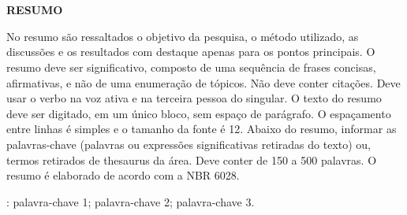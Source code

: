 \chapter*{}
\vspace{-4cm}
\begin{center}
 \textbf{RESUMO}
\end{center}
\vspace{0.5cm}

\noindent No resumo são ressaltados o objetivo da pesquisa, o método utilizado, as discussões e os resultados com destaque apenas para os pontos principais. O resumo deve ser significativo, composto de uma sequência de frases concisas, afirmativas, e não de uma enumeração de tópicos. Não deve conter citações. Deve usar o verbo na voz ativa e na terceira pessoa do singular. O texto do resumo deve ser digitado, em um único bloco, sem espaço de parágrafo. O espaçamento entre linhas é simples e o tamanho da fonte é 12. Abaixo do resumo, informar as palavras-chave (palavras ou expressões significativas retiradas do texto) ou, termos retirados de thesaurus da área. Deve conter de 150 a 500 palavras. O
resumo é elaborado de acordo com a NBR 6028.

\vspace{1cm}

: palavra-chave 1; palavra-chave 2; palavra-chave 3.